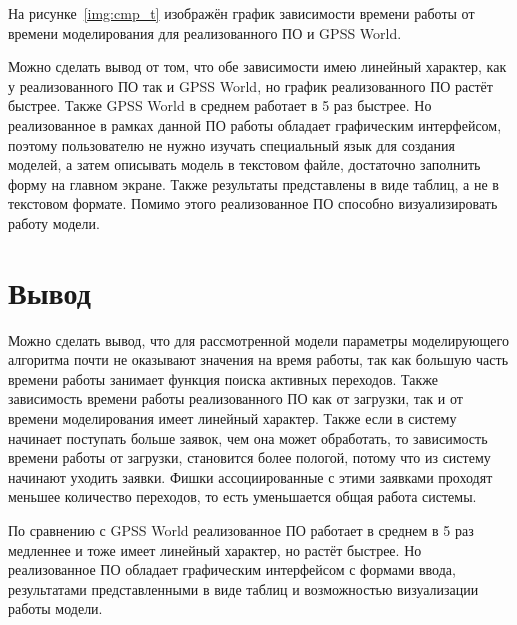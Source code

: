 \FloatBarrier

На рисунке~\ref{img:cmp_t} изображён график зависимости времени работы от времени моделирования для реализованного ПО и GPSS World.

\FloatBarrier

Можно сделать вывод от том, что обе зависимости имею линейный характер, как у реализованного ПО так и GPSS World, но график реализованного ПО растёт быстрее. Также GPSS World в среднем работает в 5 раз быстрее. Но реализованное в рамках данной ПО работы обладает графическим интерфейсом, поэтому пользователю не нужно изучать специальный язык для создания моделей, а затем описывать модель в текстовом файле, достаточно заполнить форму на главном экране. Также результаты представлены в виде таблиц, а не в текстовом формате. Помимо этого реализованное ПО способно визуализировать работу модели.

\section{Вывод}

Можно сделать вывод, что для рассмотренной модели параметры моделирующего алгоритма почти не оказывают значения на время работы, так как большую часть времени работы занимает функция поиска активных переходов. Также зависимость времени работы реализованного ПО как от загрузки, так и от времени моделирования имеет линейный характер. Также если в систему начинает поступать больше заявок, чем она может обработать, то зависимость времени работы от загрузки, становится  более пологой, потому что из систему начинают уходить заявки. Фишки ассоциированные с этими заявками проходят меньшее количество переходов, то есть уменьшается общая работа системы.

По сравнению с GPSS World реализованное ПО работает в среднем в 5 раз медленнее и тоже имеет линейный характер, но растёт быстрее. Но реализованное ПО обладает графическим интерфейсом с формами ввода, результатами представленными в виде таблиц и возможностью визуализации работы модели.